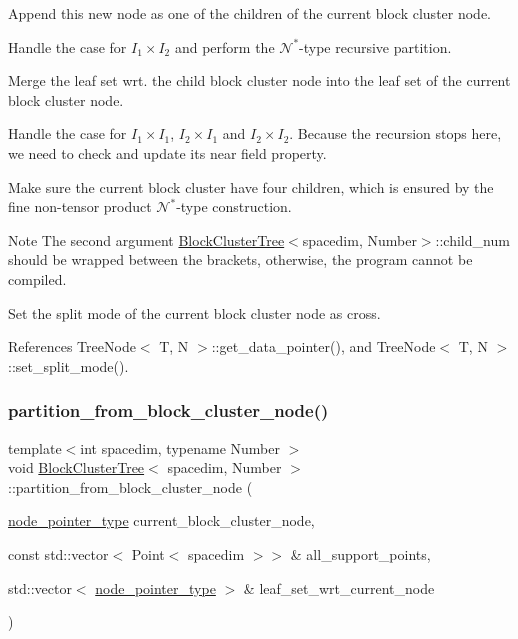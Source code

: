 Append this new node as one of the children of the current block cluster node.

Handle the case for $I_1 \times I_2$ and perform the $\mathcal{N}^*$-\/type recursive partition.

Merge the leaf set wrt. the child block cluster node into the leaf set of the current block cluster node.

Handle the case for $I_1 \times I_1$, $I_2 \times I_1$ and $I_2 \times I_2$. Because the recursion stops here, we need to check and update its near field property.

Make sure the current block cluster have four children, which is ensured by the fine non-\/tensor product $\mathcal{N}^*$-\/type construction.


\begin{DoxyDescription}
\item[Note ]The second argument {\ttfamily \hyperlink{classBlockClusterTree}{Block\+Cluster\+Tree}$<$spacedim}, Number$>$\+::child\+\_\+num should be wrapped between the brackets, otherwise, the program cannot be compiled. 
\end{DoxyDescription}

Set the split mode of the current block cluster node as cross.

References Tree\+Node$<$ T, N $>$\+::get\+\_\+data\+\_\+pointer(), and Tree\+Node$<$ T, N $>$\+::set\+\_\+split\+\_\+mode().

\mbox{\label{classBlockClusterTree_ad11fb277e43c33f2a399dc6b1c14b998}} 
\subsubsection{\texorpdfstring{partition\+\_\+from\+\_\+block\+\_\+cluster\+\_\+node()}{partition\_from\_block\_cluster\_node()}\hspace{0.1cm}{\footnotesize\ttfamily [1/2]}}
{\footnotesize\ttfamily template$<$int spacedim, typename Number $>$ \\
void \hyperlink{classBlockClusterTree}{Block\+Cluster\+Tree}$<$ spacedim, Number $>$\+::partition\+\_\+from\+\_\+block\+\_\+cluster\+\_\+node (\begin{DoxyParamCaption}\item[{\hyperlink{classTreeNode}{node\+\_\+pointer\+\_\+type}}]{current\+\_\+block\+\_\+cluster\+\_\+node,  }\item[{const std\+::vector$<$ Point$<$ spacedim $>$$>$ \&}]{all\+\_\+support\+\_\+points,  }\item[{std\+::vector$<$ \hyperlink{classTreeNode}{node\+\_\+pointer\+\_\+type} $>$ \&}]{leaf\+\_\+set\+\_\+wrt\+\_\+current\+\_\+node }\end{DoxyParamCaption})\hspace{0.3cm}{\ttfamily [private]}}

